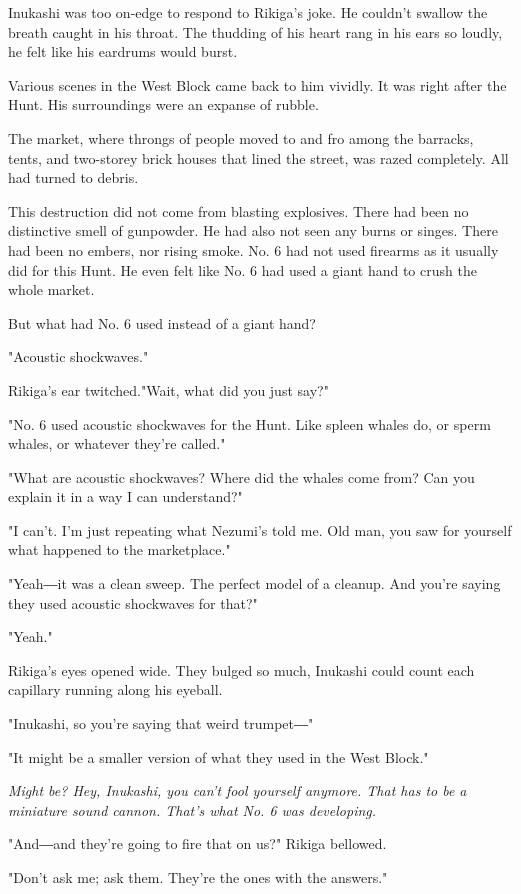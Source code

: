 Inukashi was too on-edge to respond to Rikiga's joke. He couldn't
swallow the breath caught in his throat. The thudding of his heart rang
in his ears so loudly, he felt like his eardrums would burst.

Various scenes in the West Block came back to him vividly. It was right
after the Hunt. His surroundings were an expanse of rubble.

The market, where throngs of people moved to and fro among the barracks,
tents, and two-storey brick houses that lined the street, was razed
completely. All had turned to debris.

This destruction did not come from blasting explosives. There had been
no distinctive smell of gunpowder. He had also not seen any burns or
singes. There had been no embers, nor rising smoke. No. 6 had not used
firearms as it usually did for this Hunt. He even felt like No. 6 had
used a giant hand to crush the whole market.

But what had No. 6 used instead of a giant hand?

"Acoustic shockwaves."

Rikiga's ear twitched."Wait, what did you just say?"

"No. 6 used acoustic shockwaves for the Hunt. Like spleen whales do, or
sperm whales, or whatever they're called."

"What are acoustic shockwaves? Where did the whales come from? Can you
explain it in a way I can understand?"

"I can't. I'm just repeating what Nezumi's told me. Old man, you saw for
yourself what happened to the marketplace."

"Yeah―it was a clean sweep. The perfect model of a cleanup. And you're
saying they used acoustic shockwaves for that?"

"Yeah."

Rikiga's eyes opened wide. They bulged so much, Inukashi could count
each capillary running along his eyeball.

"Inukashi, so you're saying that weird trumpet―"

"It might be a smaller version of what they used in the West Block."

\emph{Might be? Hey, Inukashi, you can't fool yourself anymore. That has to be
	a miniature sound cannon. That's what No. 6 was developing.}

"And―and they're going to fire that on us?" Rikiga bellowed.

"Don't ask me; ask them. They're the ones with the answers."

